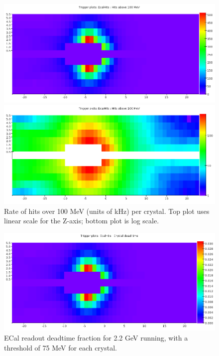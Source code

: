\begin{figure}[ht]
	\includegraphics[width=\textwidth]{performance/ecal_rate_100mev_22}

	\includegraphics[width=\textwidth]{performance/ecal_rate_100mev_22_log}
	\caption{\small{Rate of hits over 100 MeV (units of kHz) per crystal. Top plot uses linear scale for the Z-axis; bottom plot is log scale.}}
	\label{fig:ecal_rate}
\end{figure}

\begin{figure}[ht]
	\includegraphics[width=\textwidth]{performance/ecal_deadtime_22}
	\caption{\small{ECal readout deadtime fraction for 2.2 GeV running, with a threshold of 75 MeV for each crystal.}}
	\label{fig:ecal_deadtime}
\end{figure}

